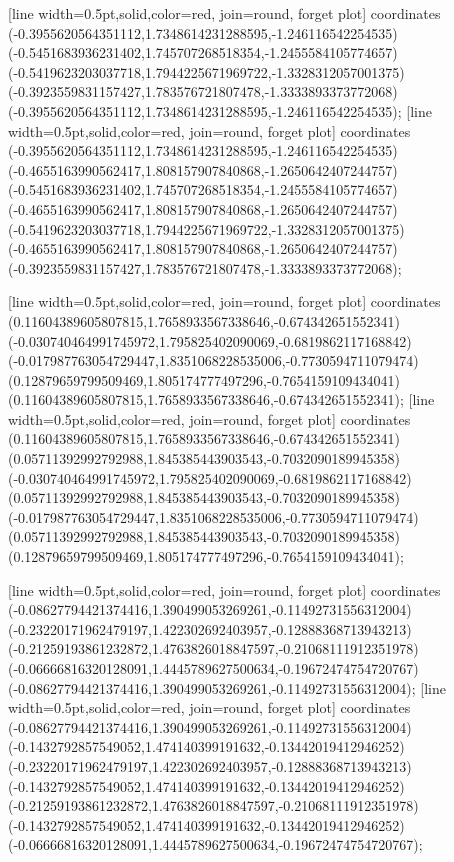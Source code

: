 [line width=0.5pt,solid,color=red, join=round, forget plot] coordinates {(-0.3955620564351112,1.7348614231288595,-1.246116542254535) (-0.5451683936231402,1.745707268518354,-1.2455584105774657) (-0.5419623203037718,1.7944225671969722,-1.3328312057001375) (-0.3923559831157427,1.783576721807478,-1.3333893373772068) (-0.3955620564351112,1.7348614231288595,-1.246116542254535)};
[line width=0.5pt,solid,color=red, join=round, forget plot] coordinates {(-0.3955620564351112,1.7348614231288595,-1.246116542254535) (-0.4655163990562417,1.808157907840868,-1.2650642407244757) (-0.5451683936231402,1.745707268518354,-1.2455584105774657) (-0.4655163990562417,1.808157907840868,-1.2650642407244757) (-0.5419623203037718,1.7944225671969722,-1.3328312057001375) (-0.4655163990562417,1.808157907840868,-1.2650642407244757) (-0.3923559831157427,1.783576721807478,-1.3333893373772068)};

[line width=0.5pt,solid,color=red, join=round, forget plot] coordinates {(0.11604389605807815,1.7658933567338646,-0.674342651552341) (-0.030740464991745972,1.795825402090069,-0.6819862117168842) (-0.017987763054729447,1.8351068228535006,-0.7730594711079474) (0.12879659799509469,1.805174777497296,-0.7654159109434041) (0.11604389605807815,1.7658933567338646,-0.674342651552341)};
[line width=0.5pt,solid,color=red, join=round, forget plot] coordinates {(0.11604389605807815,1.7658933567338646,-0.674342651552341) (0.05711392992792988,1.845385443903543,-0.7032090189945358) (-0.030740464991745972,1.795825402090069,-0.6819862117168842) (0.05711392992792988,1.845385443903543,-0.7032090189945358) (-0.017987763054729447,1.8351068228535006,-0.7730594711079474) (0.05711392992792988,1.845385443903543,-0.7032090189945358) (0.12879659799509469,1.805174777497296,-0.7654159109434041)};

[line width=0.5pt,solid,color=red, join=round, forget plot] coordinates {(-0.08627794421374416,1.390499053269261,-0.11492731556312004) (-0.23220171962479197,1.422302692403957,-0.12888368713943213) (-0.21259193861232872,1.4763826018847597,-0.21068111912351978) (-0.06666816320128091,1.4445789627500634,-0.19672474754720767) (-0.08627794421374416,1.390499053269261,-0.11492731556312004)};
[line width=0.5pt,solid,color=red, join=round, forget plot] coordinates {(-0.08627794421374416,1.390499053269261,-0.11492731556312004) (-0.1432792857549052,1.474140399191632,-0.13442019412946252) (-0.23220171962479197,1.422302692403957,-0.12888368713943213) (-0.1432792857549052,1.474140399191632,-0.13442019412946252) (-0.21259193861232872,1.4763826018847597,-0.21068111912351978) (-0.1432792857549052,1.474140399191632,-0.13442019412946252) (-0.06666816320128091,1.4445789627500634,-0.19672474754720767)};

